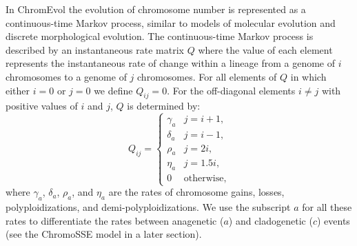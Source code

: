 In ChromEvol the evolution of chromosome number
is represented as a continuous-time Markov process,
similar to models of molecular evolution and discrete morphological evolution.
The continuous-time Markov process is described by
an instantaneous rate matrix $Q$ where the value of each element
represents the instantaneous rate of change within a lineage
from a genome of $i$ chromosomes to a genome of $j$ chromosomes.
For all elements of $Q$ in which either $i = 0$ or $j = 0$
we define $Q_{ij} = 0$.
For the off-diagonal elements $i \neq j$ with positive values of $i$ and $j$,
$Q$ is determined by:
\begin{equation} \label{eq:anagenetic1}
Q_{ij} = 
    \begin{cases}
        \gamma_a                          & j = i + 1,    \\
        \delta_a                          & j = i - 1,    \\
        \rho_a                                & j = 2i,       \\
        \eta_a                                 & j = 1.5i,     \\
        0                                   & \mbox{otherwise},   
    \end{cases}
\end{equation}
where $\gamma_a$, $\delta_a$, $\rho_a$, and $\eta_a$ are the
rates of chromosome gains, losses, polyploidizations, and
demi-polyploidizations.
We use the subscript $a$ for all these rates to differentiate the rates between anagenetic ($a$) and cladogenetic ($c$) events (see the ChromoSSE model in a later section).

